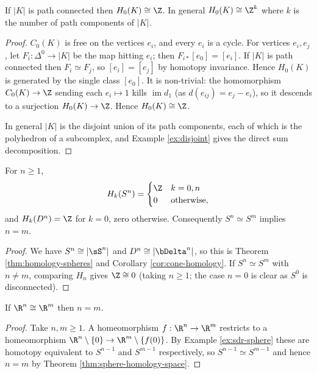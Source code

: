 \begin{proposition} \label{prop:h0}
	If $|K|$ is path connected then $H_0(K)\cong\Z$. In general $H_0(K)\cong\Z^k$ where $k$ is the number of path components of $|K|$.
\end{proposition}
\begin{proof}
	$C_0(K)$ is free on the vertices $e_i$, and every $e_i$ is a cycle. For vertices $e_i, e_j$, let $F_i: \Delta^0 \to |K|$ be the map hitting $e_i$; then $F_{i*}[e_0] = [e_i]$. If $|K|$ is path connected then $F_i \simeq F_j$, so $[e_i] = [e_j]$ by homotopy invariance. Hence $H_0(K)$ is generated by the single class $[e_0]$. It is non-trivial: the homomorphism $C_0(K)\to\Z$ sending each $e_i \mapsto 1$ kills $\operatorname{im}d_1$ (as $d(e_{ij}) = e_j - e_i$), so it descends to a surjection $H_0(K)\to\Z$. Hence $H_0(K)\cong\Z$.

	In general $|K|$ is the disjoint union of its path components, each of which is the polyhedron of a subcomplex, and Example \ref{ex:disjoint} gives the direct sum decomposition.
\end{proof}

\begin{theorem} \label{thm:sphere-homology-space}
	For $n \geq 1$,
	$$
	H_k(S^n) = \begin{cases}\Z & k = 0, n\\ 0 & \text{otherwise},\end{cases}
	$$
	and $H_k(D^n) = \Z$ for $k = 0$, zero otherwise. Consequently $S^n \simeq S^m$ implies $n = m$.
\end{theorem}
\begin{proof}
	We have $S^n \cong |\sS^n|$ and $D^n \cong |\bDelta^n|$, so this is Theorem \ref{thm:homology-spheres} and Corollary \ref{cor:cone-homology}. If $S^n \simeq S^m$ with $n \neq m$, comparing $H_n$ gives $\Z \cong 0$ (taking $n \geq 1$; the case $n = 0$ is clear as $S^0$ is disconnected).
\end{proof}

\begin{corollary}
	If $\R^n \cong \R^m$ then $n = m$.
\end{corollary}
\begin{proof}
	Take $n, m \geq 1$. A homeomorphism $f: \R^n \to \R^m$ restricts to a homeomorphism $\R^n\setminus\{0\}\to\R^m\setminus\{f(0)\}$. By Example \ref{ex:sdr-sphere} these are homotopy equivalent to $S^{n-1}$ and $S^{m-1}$ respectively, so $S^{n-1}\simeq S^{m-1}$ and hence $n = m$ by Theorem \ref{thm:sphere-homology-space}.
\end{proof}

